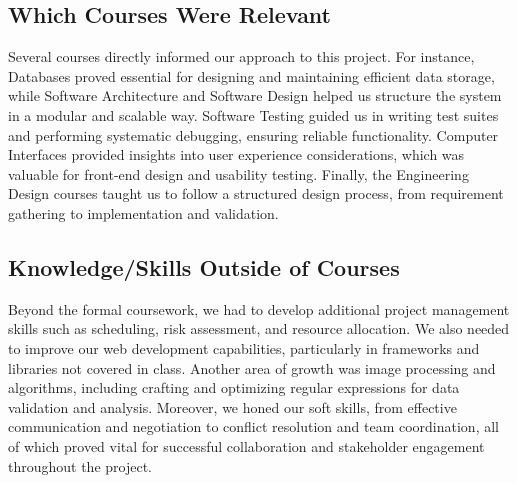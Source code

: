 \documentclass{article}
\begin{document}
\subsection{Which Courses Were Relevant}

Several courses directly informed our approach to this project. For instance, Databases proved essential for designing and maintaining efficient data storage, while Software Architecture and Software Design helped us structure the system in a modular and scalable way. Software Testing guided us in writing test suites and performing systematic debugging, ensuring reliable functionality. Computer Interfaces provided insights into user experience considerations, which was valuable for front-end design and usability testing. Finally, the Engineering Design courses taught us to follow a structured design process, from requirement gathering to implementation and validation.

\subsection{Knowledge/Skills Outside of Courses}


Beyond the formal coursework, we had to develop additional project management skills such as scheduling, risk assessment, and resource allocation. We also needed to improve our web development capabilities, particularly in frameworks and libraries not covered in class. Another area of growth was image processing and algorithms, including crafting and optimizing regular expressions for data validation and analysis. Moreover, we honed our soft skills, from effective communication and negotiation to conflict resolution and team coordination, all of which proved vital for successful collaboration and stakeholder engagement throughout the project.
\end{document}
